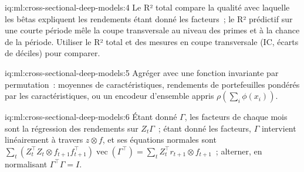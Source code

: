 \begin{solution}{iq:ml:cross-sectional-deep-models:4}
Le R² total compare la qualité avec laquelle les bêtas expliquent les rendements étant donné les facteurs~; le R² prédictif sur une courte période mêle la
coupe transversale au niveau des primes et à la chance de la période. Utiliser le R² total et des mesures en coupe transversale (IC, écarts
de déciles) pour comparer.
\end{solution}

\begin{solution}{iq:ml:cross-sectional-deep-models:5}
Agréger avec une fonction invariante par permutation~: moyennes de caractéristiques, rendements de portefeuilles pondérés par les caractéristiques,
ou un encodeur d'ensemble appris $\rho(\sum_i\phi(x_i))$.
\end{solution}

\begin{solution}{iq:ml:cross-sectional-deep-models:6}
Étant donné $\Gamma$, les facteurs de chaque mois sont la régression des rendements sur $Z_t\Gamma$~; étant donné les facteurs, $\Gamma$ intervient linéairement
à travers $z\otimes f$, et ses équations normales sont $\sum_t(Z_t^\top Z_t\otimes f_{t+1}f_{t+1}^\top)\operatorname{vec}(\Gamma^\top)
= \sum_tZ_t^\top r_{t+1}\otimes f_{t+1}$~; alterner, en normalisant $\Gamma^\top\Gamma = I$.
\end{solution}
